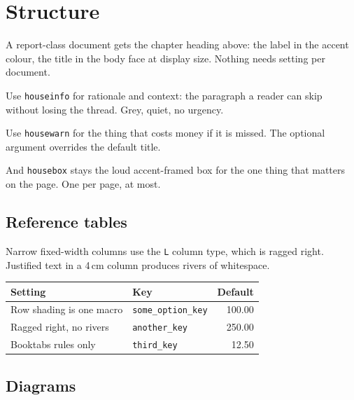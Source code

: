 \documentclass[11pt,a4paper,oneside]{report}
\begin{document}
\chapter{Structure}

A report-class document gets the chapter heading above: the label in the accent
colour, the title in the body face at display size. Nothing needs setting per
document.

\begin{houseinfo}
Use \texttt{houseinfo} for rationale and context: the paragraph a reader can
skip without losing the thread. Grey, quiet, no urgency.
\end{houseinfo}

\begin{housewarn}
Use \texttt{housewarn} for the thing that costs money if it is missed. The
optional argument overrides the default title.
\end{housewarn}

\begin{housebox}
And \texttt{housebox} stays the loud accent-framed box for the one thing that
matters on the page. One per page, at most.
\end{housebox}

\section{Reference tables}

Narrow fixed-width columns use the \texttt{L} column type, which is ragged
right. Justified text in a 4\,cm column produces rivers of whitespace.

\begin{center}
\begin{tabular}{@{}L{5.0cm}L{4.4cm}r@{}}
\toprule
\textbf{Setting} & \textbf{Key} & \textbf{Default} \\
\midrule
{}
Row shading is one macro   & \texttt{some\_option\_key} & 100.00 \\
Ragged right, no rivers    & \texttt{another\_key}      & 250.00 \\
Booktabs rules only        & \texttt{third\_key}        & 12.50 \\
\bottomrule
\end{tabular}
\end{center}

\section{Diagrams}
\end{document}

